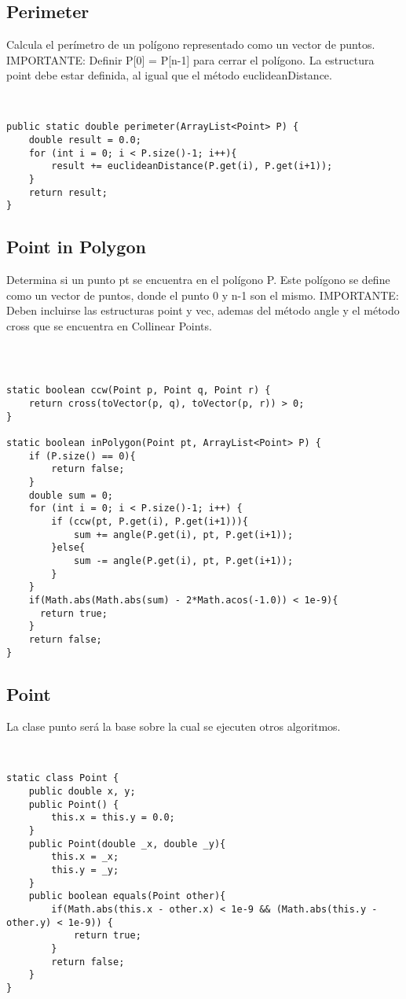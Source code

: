 \documentclass[11pt,letterpaper,twocolumn,twosided]{article}
\begin{document}
\subsection{Perimeter}
Calcula el per\'imetro de un pol\'igono representado como un vector de puntos. IMPORTANTE: Definir P[0] = P[n-1] para cerrar el pol\'igono. La estructura point debe estar definida, al igual que el m\'etodo euclideanDistance.
\begin{lstlisting}


public static double perimeter(ArrayList<Point> P) {
	double result = 0.0;
  	for (int i = 0; i < P.size()-1; i++){
        result += euclideanDistance(P.get(i), P.get(i+1));
  	}
  	return result; 
}
\end{lstlisting}

\subsection{Point in Polygon}
Determina si un punto pt se encuentra en el pol\'igono P. Este pol\'igono se define como un vector de puntos, donde el punto 0 y n-1 son el mismo. IMPORTANTE: Deben incluirse las estructuras point y vec, ademas del m\'etodo angle y el m\'etodo cross que se encuentra en Collinear Points.
\begin{lstlisting}



static boolean ccw(Point p, Point q, Point r) {
    return cross(toVector(p, q), toVector(p, r)) > 0; 
}
  
static boolean inPolygon(Point pt, ArrayList<Point> P) {
    if (P.size() == 0){
        return false;
    } 
    double sum = 0;    
    for (int i = 0; i < P.size()-1; i++) {
        if (ccw(pt, P.get(i), P.get(i+1))){
            sum += angle(P.get(i), pt, P.get(i+1)); 
        }else{
    	    sum -= angle(P.get(i), pt, P.get(i+1));
        }
    }
    if(Math.abs(Math.abs(sum) - 2*Math.acos(-1.0)) < 1e-9){
      return true;
    }
    return false;
}
\end{lstlisting}

\subsection{Point}
La clase punto ser\'a la base sobre la cual se ejecuten otros algoritmos. 
\begin{lstlisting}


static class Point { 
	public double x, y;
  	public Point() { 
  		this.x = this.y = 0.0; 
  	}
  	public Point(double _x, double _y){
  		this.x = _x;
  		this.y = _y;
  	} 
  	public boolean equals(Point other){
  		if(Math.abs(this.x - other.x) < 1e-9 && (Math.abs(this.y - other.y) < 1e-9)) {
  			return true;
  		}
  		return false;
  	}
}
\end{lstlisting}
\end{document}
